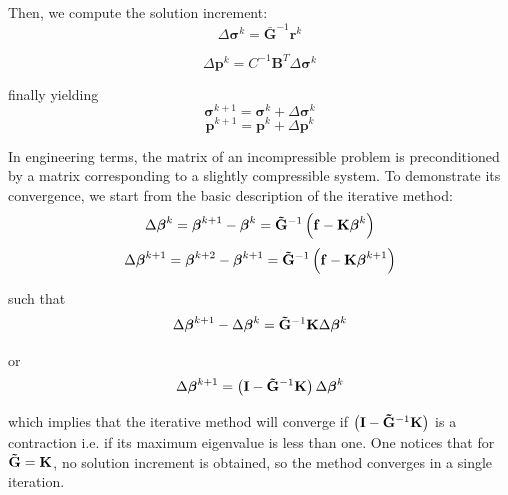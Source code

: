 \documentclass{wccm2024}
\begin{document}
\noindent Then, we compute the solution increment:
\vskip -0.3cm
\begin{equation}
    \Delta\boldsymbol{\sigma}^k = \mathbf{\bar{G}}^{-1} \mathbf{r}^{k}
\end{equation}

\begin{equation}
\Delta \mathbf{p}^k = C^{-1}\mathbf{B}^T\Delta \boldsymbol{\sigma}^k
\end{equation}

\noindent finally yielding
\vskip -0.3cm
\begin{equation}
    \boldsymbol{\sigma}^{k+1} = \boldsymbol{\sigma}^{k} + \Delta\boldsymbol{\sigma}^k
\end{equation}
\vskip -0.3cm
\begin{equation}
    \mathbf{p}^{k+1} = \mathbf{p}^{k} + \Delta\mathbf{p}^k
\end{equation}

In engineering terms, the matrix of an incompressible problem is preconditioned by a matrix corresponding to a slightly compressible system. To demonstrate its convergence, we start from the basic description of the iterative method:
\vskip -0.3cm
\begin{equation}
    \Delta\boldsymbol{\beta}^{k} = \boldsymbol{\beta}^{k+1} - \boldsymbol{\beta}^{k} = \mathbf{\Tilde{G}}^{-1} \left( \mathbf{f} - \mathbf{K} \boldsymbol{\beta}^k \right)
\end{equation}
\vskip -0.3cm
\begin{equation}
    \Delta\boldsymbol{\beta}^{k+1} = \boldsymbol{\beta}^{k+2} - \boldsymbol{\beta}^{k+1} = \mathbf{\Tilde{G}}^{-1} \left( \mathbf{f} - \mathbf{K} \boldsymbol{\beta}^{k+1} \right)
\end{equation}

\noindent such that
\vskip -0.3cm
\begin{equation}
    \Delta\boldsymbol{\beta}^{k+1} - \Delta\boldsymbol{\beta}^{k} = \mathbf{\Tilde{G}}^{-1} \mathbf{K} \Delta\boldsymbol{\beta}^{k}
\end{equation}

\noindent or
\vskip -0.3cm
\begin{equation}
    \Delta\boldsymbol{\beta}^{k+1} = \left( \mathbf{I} - \mathbf{\Tilde{G}}^{-1} \mathbf{K} \right) \Delta\boldsymbol{\beta}^{k}
\end{equation}

\noindent which implies that the iterative method will converge if $\left( \mathbf{I} - \mathbf{\Tilde{G}}^{-1} \mathbf{K} \right)$ is a contraction i.e. if its maximum eigenvalue is less than one. One notices that for $\mathbf{\Tilde{G}} = \mathbf{K}$, no solution increment is obtained, so the method converges in a single iteration.
\end{document}
